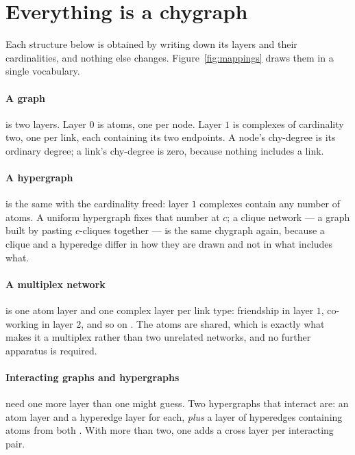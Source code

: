 \section{Everything is a chygraph}
\label{sec:everything}

Each structure below is obtained by writing down its layers and their
cardinalities, and nothing else changes. Figure~\ref{fig:mappings} draws them in
a single vocabulary.

\paragraph{A graph} is two layers. Layer $0$ is atoms, one per node. Layer $1$
is complexes of cardinality two, one per link, each containing its two
endpoints. A node's chy-degree is its ordinary degree; a link's chy-degree is
zero, because nothing includes a link.

\paragraph{A hypergraph} is the same with the cardinality freed: layer $1$
complexes contain any number of atoms. A uniform hypergraph fixes that number at
$c$; a clique network --- a graph built by pasting $c$-cliques together --- is
the same chygraph again, because a clique and a hyperedge differ in how they are
drawn and not in what includes what.

\paragraph{A multiplex network} is one atom layer and one complex layer per link
type: friendship in layer $1$, co-working in layer $2$, and so on
\citep{gomez2013,kivela2014}. The atoms are shared, which is exactly what makes
it a multiplex rather than two unrelated networks, and no further apparatus is
required.

\paragraph{Interacting graphs and hypergraphs} need one more layer than one
might guess. Two hypergraphs that interact are: an atom layer and a hyperedge
layer for each, \emph{plus} a layer of hyperedges containing atoms from both
\citep{leicht2009,bianconi2017}. With more than two, one adds a cross layer per
interacting pair.

